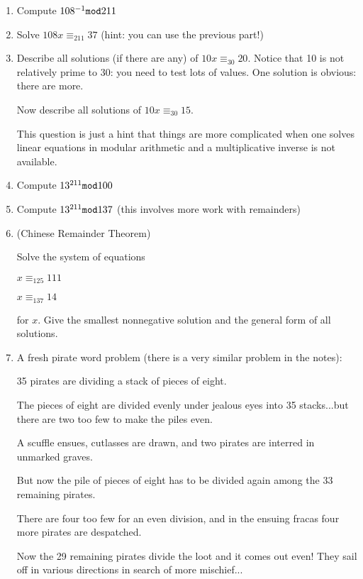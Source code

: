 \documentclass[12pt]{article}
\begin{document}
\begin{enumerate}

\item  Compute $108^{-1} {\tt mod} 211$

\item  Solve $108x \equiv_{211}  37$  (hint:  you can use the previous part!)

\item  Describe all solutions (if there are any) of $10x \equiv_{30} 20$.  Notice that 10 is not relatively prime to 30:  you need to test lots of values.  One solution is obvious:  there are more.

Now describe all solutions of $10x \equiv_{30} 15$.

This question is just a hint that things are more complicated when one solves linear equations in modular arithmetic and a multiplicative inverse is not available.

\item  Compute $13^{211} {\tt mod} 100$

\item  Compute $13^{211} {\tt mod} 137$  (this involves more work with remainders)

\item  (Chinese Remainder Theorem) 

Solve the system of equations

$x \equiv_{125} 111$

$x \equiv_{137} 14$

for $x$.  Give the smallest nonnegative solution and the general form of all solutions.

\item  A fresh pirate word problem (there is a very similar problem in the notes):

35 pirates are dividing a stack of pieces of eight.

The pieces of eight are divided evenly under jealous eyes into 35 stacks...but there are two  too few to make the piles even.

A scuffle ensues, cutlasses are drawn, and two  pirates are interred in unmarked graves.

But now the pile of pieces of eight has to be divided again among the 33  remaining pirates.

There are four too few for an even division, and in the ensuing fracas four more pirates are despatched.

Now the 29 remaining pirates divide the loot and it comes out even!  They sail off in various directions in search of more mischief...


\end{enumerate}
\end{document}
